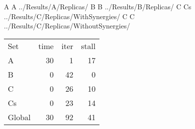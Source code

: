 A A ../Results/A/Replicas/
B B ../Results/B/Replicas/
C Cs ../Results/C/Replicas/WithSynergies/
C C ../Results/C/Replicas/WithoutSynergies/
\begin{tabular}{|l|r|r|r|}
\hline
Set & time & iter & stall \\

A & 30 & 1 & 17 \\

B & 0 & 42 & 0 \\

C & 0 & 26 & 10 \\

Cs & 0 & 23 & 14 \\

Global & 30 & 92 & 41 \\

\hline
\end{tabular}
